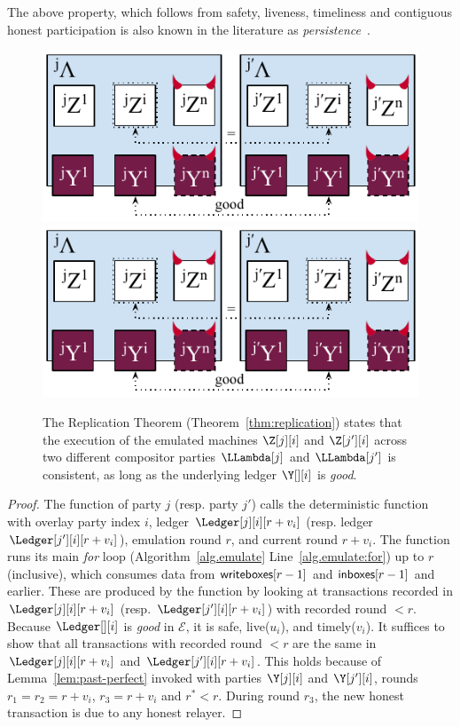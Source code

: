 The above property, which follows from safety, liveness, timeliness and
contiguous honest participation is also known in the literature as
\emph{persistence}~\cite{backbone}.

\begin{figure}
  \centering
  \iftwocolumn
  \includegraphics[width=0.7 \columnwidth,keepaspectratio]{figures/rollerblade-cross-party.pdf}
  \else
  \includegraphics[width=0.6 \columnwidth,keepaspectratio]{figures/rollerblade-cross-party.pdf}
  \fi
  \caption{The Replication Theorem (Theorem~\ref{thm:replication}) states that
  the execution of the emulated machines $\Z[j][i]$ and $\Z[j'][i]$
  across two different compositor parties $\LLambda[j]$ and $\LLambda[j']$
  is consistent, as long as the underlying ledger $\Y[][i]$ is \emph{good}.}
  \label{fig.cross-party}
\end{figure}

\begin{proof}
  The function \emulationSnapshot of party $j$ (resp. party $j'$)
  calls the deterministic function \emulate with overlay party index $i$,
  ledger $\Ledger[j][i][r + v_i]$ (resp. ledger $\Ledger[j'][i][r + v_i]$), emulation round
  $r$, and current round $r + v_i$. The function \emulate runs its main
  \emph{for} loop (Algorithm~\ref{alg.emulate} Line~\ref{alg.emulate:for})
  up to $r$ (inclusive), which consumes data from $\textsf{writeboxes}[r - 1]$
  and $\textsf{inboxes}[r - 1]$ and earlier. These are produced by the function
  \prepareEmulationInputs by looking at transactions recorded in $\Ledger[j][i][r + v_i]$
  (resp. $\Ledger[j'][i][r + v_i]$) with recorded round $< r$.
  Because $\Ledger[][i]$ is \emph{good} in $\mathcal{E}$, it is safe, live($u_i$), and timely($v_i$).
  It suffices to show that all transactions with recorded round
  $< r$ are the same in $\Ledger[j][i][r + v_i]$ and $\Ledger[j'][i][r + v_i]$.
  This holds because of Lemma~\ref{lem:past-perfect} invoked with parties $\Y[j][i]$ and $\Y[j'][i]$,
  rounds $r_1 = r_2 = r + v_i$, $r_3 = r + v_i$ and $r^* < r$.
  During round $r_3$, the new honest transaction is due to any honest
  relayer.\Qed
\end{proof}

